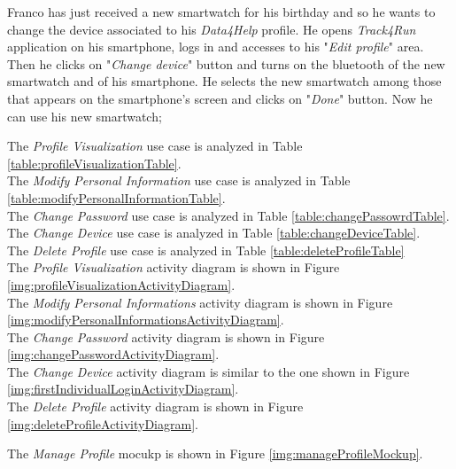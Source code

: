 Franco has just received a new smartwatch for his birthday and so he wants to change the device associated to his \textit{Data4Help} profile. He opens \textit{Track4Run} application on his smartphone, logs in and accesses to his "\textit{Edit profile}" area. Then he clicks on "\textit{Change device}" button and turns on the bluetooth of the new smartwatch and of his smartphone. He selects the new smartwatch among those that appears on the smartphone's screen and clicks on "\textit{Done}" button. Now he can use his new smartwatch;

The \textit{Profile Visualization} use case is analyzed in Table \ref{table:profileVisualizationTable}. \\
The \textit{Modify Personal Information} use case is analyzed in Table \ref{table:modifyPersonalInformationTable}. \\
The \textit{Change Password} use case is analyzed in Table \ref{table:changePassowrdTable}. \\
The \textit{Change Device} use case is analyzed in Table \ref{table:changeDeviceTable}. \\
The \textit{Delete Profile} use case is analyzed in Table \ref{table:deleteProfileTable} \\

The \textit{Profile Visualization} activity diagram is shown in Figure \ref{img:profileVisualizationActivityDiagram}. \\
The \textit{Modify Personal Informations} activity diagram is shown in Figure \ref{img:modifyPersonalInformationsActivityDiagram}. \\
The \textit{Change Password} activity diagram is shown in Figure \ref{img:changePasswordActivityDiagram}. \\
The \textit{Change Device} activity diagram is similar to the one shown in Figure \ref{img:firstIndividualLoginActivityDiagram}. \\
The \textit{Delete Profile} activity diagram is shown in Figure \ref{img:deleteProfileActivityDiagram}.

The \textit{Manage Profile} mocukp is shown in Figure \ref{img:manageProfileMockup}.

